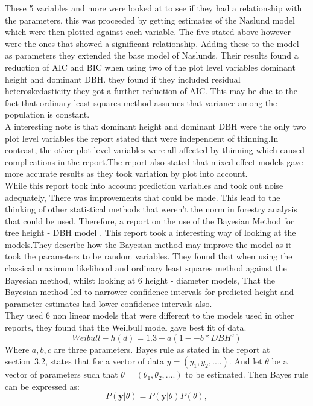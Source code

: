 \documentclass[a4paper,11pt,twoside]{report}
\begin{document}
These 5 variables and more were looked at to see if they had a relationship with the parameters, this was proceeded by getting estimates of the Naslund model which were then plotted against each variable. The five stated above however were the ones that showed a significant relationship.
Adding these to the model as parameters they extended the base model of Naslunds.
Their results found a reduction of AIC and BIC when using two of the plot level variables dominant height and dominant DBH. they found if they included residual heteroskedasticity they got a further reduction of AIC.
This may be due to the fact that ordinary least squares method assumes that variance among the population is constant.\\
A interesting note is that dominant height and dominant DBH were the only two plot level variables the report stated that were independent of thinning.In contrast, the other plot level variables were all affected by thinning which caused complications in the report.The report also stated that mixed effect models gave more accurate results as they took variation by plot into account.\\
While this report took into account prediction variables and took out noise adequately, There was improvements that could be made. This lead to the thinking of other statistical methods that weren't the norm in forestry analysis that could be used. Therefore, a report on the use of the Bayesian Method for tree height - DBH model \cite{zhang2014estimating}.
This report took a interesting way of looking at the models.They describe how the Bayesian method may improve the model as it took the parameters to be random variables. They found that when using the classical maximum likelihood and ordinary least squares method against the Bayesian method, whilst looking at 6 height - diameter models, That the Bayesian method led to narrower confidence intervals for predicted height and parameter estimates had lower confidence intervals also.\\
They used 6 non linear models that were different to the models used in other reports, they found that the Weilbull model gave best fit of data.\begin{equation}
Weibull-  h(d) = 1.3 + a(1-{-b*DBH^c})
\end{equation}
Where $a,b,c$ are three parameters.
Bayes rule as stated in the report at section~3.2\cite{zhang2014estimating},
states that for a vector of data $y= (y_1,y_2,....)$.
And let $\theta$ be a vector of parameters such that $\theta = (\theta_1,\theta_2,....)$ to be estimated. Then Bayes rule can be expressed as:\begin{equation}
\label{eq:Bayes rule}
P(\textbf{y}|\theta) = P(\textbf{y} |\theta)P(\theta ),
\end{equation}
\end{document}

